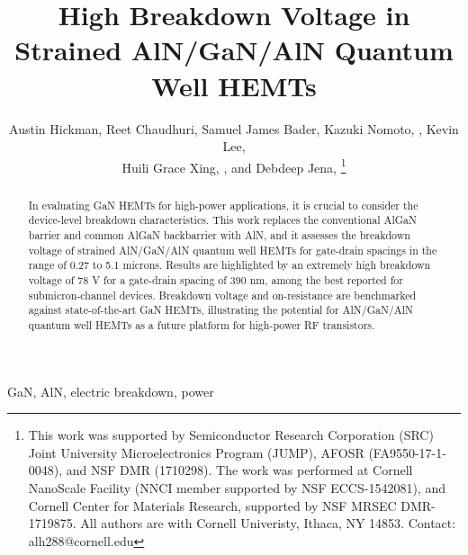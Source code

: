 \documentclass[journal]{IEEEtran}
\newif\ifarxiv
\begin{document}
\title{High Breakdown Voltage in Strained AlN/GaN/AlN Quantum Well HEMTs}

\author{Austin Hickman, Reet Chaudhuri, Samuel James Bader, Kazuki Nomoto, , Kevin Lee, \\ Huili Grace Xing, , and Debdeep Jena, %
\thanks{
  This work was supported by Semiconductor Research Corporation (SRC) Joint University Microelectronics Program (JUMP), AFOSR (FA9550-17-1-0048), and NSF DMR (1710298). The work was performed at Cornell NanoScale Facility (NNCI member supported by NSF ECCS-1542081), and Cornell Center for Materials Research, supported by NSF MRSEC DMR-1719875. All authors are with Cornell Univeristy, Ithaca, NY 14853. Contact: alh288@cornell.edu }}

\ifarxiv \else
{}%
{}
\fi
% 

\maketitle

\begin{abstract}
In evaluating GaN HEMTs for high-power applications, it is crucial to consider the device-level breakdown characteristics. This work replaces the conventional AlGaN barrier and common AlGaN backbarrier with AlN, and it assesses the breakdown voltage of strained AlN/GaN/AlN quantum well HEMTs for gate-drain spacings in the range of 0.27 to 5.1 microns. Results are highlighted by an extremely high breakdown voltage of 78 V for a gate-drain spacing of 390 nm, among the best reported for submicron-channel devices. Breakdown voltage and on-resistance are benchmarked against state-of-the-art GaN HEMTs, illustrating the potential for AlN/GaN/AlN quantum well HEMTs as a future platform for high-power RF transistors.
\end{abstract}

\begin{IEEEkeywords}
  GaN, AlN, electric breakdown, power
\end{IEEEkeywords}
\end{document}
